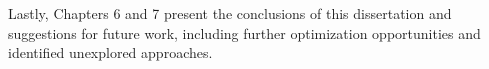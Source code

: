 \documentclass[../thesis]{subfiles}
\begin{document}
	Lastly, Chapters 6 and 7 present the conclusions of this dissertation and suggestions for future work, including further optimization opportunities and identified unexplored approaches.

\end{document}
